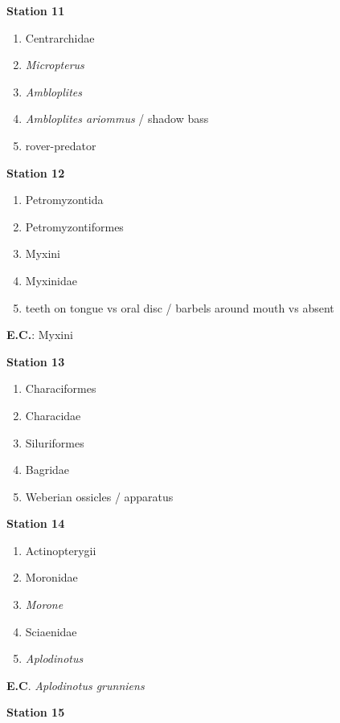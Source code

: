 \textbf{Station 11}

\begin{enumerate}
\def\labelenumi{\arabic{enumi}.}
\setcounter{enumi}{49}
\item
  Centrarchidae
\item
  \emph{Micropterus}
\item
  \emph{Ambloplites}
\item
  \emph{Ambloplites ariommus} / shadow bass
\item
  rover-predator
\end{enumerate}

\textbf{Station 12}

\begin{enumerate}
\def\labelenumi{\arabic{enumi}.}
\setcounter{enumi}{54}
\item
  Petromyzontida
\item
  Petromyzontiformes
\item
  Myxini
\item
  Myxinidae
\item
  teeth on tongue vs oral disc / barbels around mouth vs absent
\end{enumerate}

\textbf{E.C.}: Myxini

\textbf{Station 13}

\begin{enumerate}
\def\labelenumi{\arabic{enumi}.}
\setcounter{enumi}{59}
\item
  Characiformes
\item
  Characidae
\item
  Siluriformes
\item
  Bagridae
\item
  Weberian ossicles / apparatus
\end{enumerate}

\textbf{Station 14}

\begin{enumerate}
\def\labelenumi{\arabic{enumi}.}
\setcounter{enumi}{64}
\item
  Actinopterygii
\item
  Moronidae
\item
  \emph{Morone}
\item
  Sciaenidae
\item
  \emph{Aplodinotus}
\end{enumerate}

\textbf{E.C}. \emph{Aplodinotus grunniens}

\textbf{Station 15}

